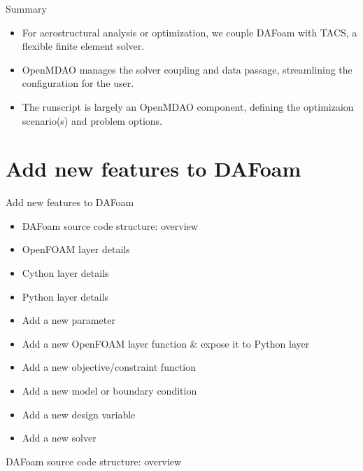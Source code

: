 \documentclass{bredelebeamer}
\begin{document}
\begin{frame}[fragile]{Summary}
  \begin{itemize}
    \setlength\itemsep{1em}
    \item For aerostructural analysis or optimization, we couple DAFoam with TACS, a flexible finite element solver.
    \item OpenMDAO manages the solver coupling and data passage, streamlining the configuration for the user.
    \item The runscript is largely an OpenMDAO component, defining the optimizaion scenario(s) and problem options.
  \end{itemize}
\end{frame}


\section{Add new features to DAFoam}
\renewcommand{\arraystretch}{2}

\begin{frame}{}
  \center \Large Add new features to DAFoam
  \normalsize
  \begin{itemize}
    \setlength\itemsep{1em}
    \item DAFoam source code structure: overview
    \item OpenFOAM layer details
    \item Cython layer details
    \item Python layer details
    \item Add a new parameter
    \item Add a new OpenFOAM layer function \& expose it to Python layer
    \item Add a new objective/constraint function
    \item Add a new model or boundary condition
    \item Add a new design variable
    \item Add a new solver
  \end{itemize}
\end{frame}

\begin{frame}{}
  \center \Large DAFoam source code structure: overview
\end{frame}
\end{document}
